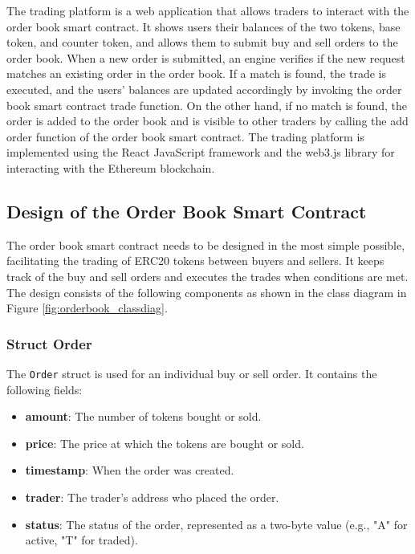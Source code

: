 The trading platform is a web application that allows traders to interact with the order book smart contract. It shows
users their balances of the two tokens, base token, and counter token, and allows them to submit buy and sell orders to the order book. When a new order
is submitted, an engine verifies if the new request matches an existing order in the order book. If a match is found, the trade is
executed, and the users' balances are updated accordingly by invoking the order book smart contract trade function. On the other hand, if no match is found, the order
is added to the order book and is visible to other traders by calling the add order function of the order book smart contract. The trading platform is
implemented using the React JavaScript framework and the web3.js library for interacting with the Ethereum blockchain.


\subsection{Design of the Order Book Smart Contract}

The order book smart contract needs to be designed in the most simple possible, facilitating the trading of ERC20 tokens between buyers and sellers. It
keeps track of the buy and sell orders and executes the trades when conditions are met. The design consists of the following components
as shown in the class diagram in Figure \ref{fig:orderbook_classdiag}.






\subsubsection{Struct Order}


The \texttt{Order} struct is used for an individual buy or sell order. It contains the following fields:
\begin{itemize}
    \item \textbf{amount}: The number of tokens bought or sold.
    \item \textbf{price}: The price at which the tokens are bought or sold.
    \item \textbf{timestamp}: When the order was created.
    \item \textbf{trader}: The trader's address who placed the order.
    \item \textbf{status}: The status of the order, represented as a two-byte value (e.g., "A" for active, "T" for traded).
\end{itemize}


